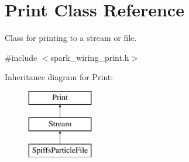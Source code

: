 \hypertarget{class_print}{}\section{Print Class Reference}
\label{class_print}


Class for printing to a stream or file.  




{\ttfamily \#include $<$spark\+\_\+wiring\+\_\+print.\+h$>$}

Inheritance diagram for Print\+:\begin{figure}[H]
\begin{center}
\leavevmode
\includegraphics[height=3.000000cm]{class_print}
\end{center}
\end{figure}
